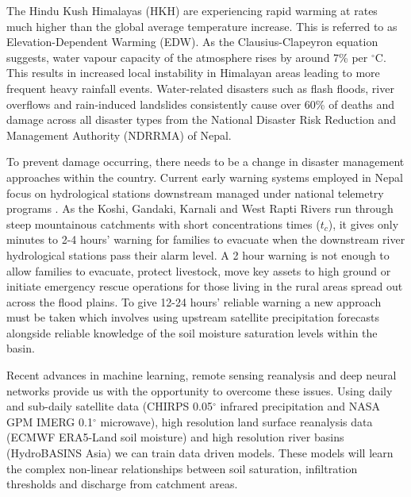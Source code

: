 \documentclass[journal]{IEEEtran}
\begin{document}
The Hindu Kush Himalayas (HKH) are experiencing rapid warming at rates much higher than the global average temperature increase. This is referred to as Elevation-Dependent Warming (EDW). As the Clausius-Clapeyron equation suggests, water vapour capacity of the atmosphere rises by around 7\% per $^\circ$C. This results in increased local instability in Himalayan areas leading to more frequent heavy rainfall events. Water-related disasters such as flash floods, river overflows and rain-induced landslides consistently cause over 60\% of deaths and damage across all disaster types from the National Disaster Risk Reduction and Management Authority (NDRRMA) of Nepal.

To prevent damage occurring, there needs to be a change in disaster management approaches within the country. Current early warning systems employed in Nepal focus on hydrological stations downstream managed under national telemetry programs \cite{dhm2023portal, dhm2024river}. As the Koshi, Gandaki, Karnali and West Rapti Rivers run through steep mountainous catchments with short concentrations times ($t_c$), it gives only minutes to 2-4 hours' warning for families to evacuate when the downstream river hydrological stations pass their alarm level. A 2 hour warning is not enough to allow families to evacuate, protect livestock, move key assets to high ground or initiate emergency rescue operations for those living in the rural areas spread out across the flood plains. To give 12-24 hours' reliable warning a new approach must be taken which involves using upstream satellite precipitation forecasts alongside reliable knowledge of the soil moisture saturation levels within the basin.

Recent advances in machine learning, remote sensing reanalysis and deep neural networks provide us with the opportunity to overcome these issues. Using daily and sub-daily satellite data (CHIRPS 0.05$^\circ$ infrared precipitation and NASA GPM IMERG 0.1$^\circ$ microwave), high resolution land surface reanalysis data (ECMWF ERA5-Land soil moisture) and high resolution river basins (HydroBASINS Asia) we can train data driven models. These models will learn the complex non-linear relationships between soil saturation, infiltration thresholds and discharge from catchment areas.
\end{document}
